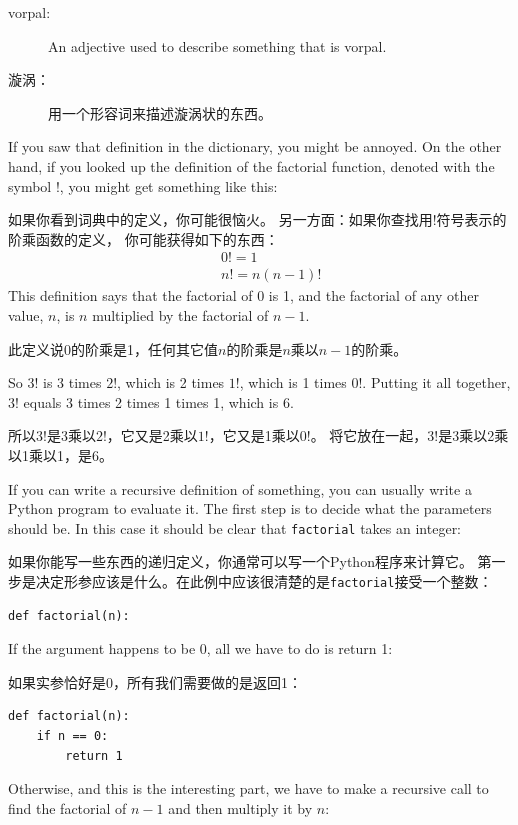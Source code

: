 \documentclass[10pt]{book}
\begin{document}
\begin{CJK}{UTF8}{gbsn}
\begin{description}
\item[vorpal:] An adjective used to describe something that is vorpal.

\item[漩涡：] 用一个形容词来描述漩涡状的东西。

\end{description}

If you saw that definition in the dictionary, you might be annoyed. On
the other hand, if you looked up the definition of the factorial
function, denoted with the symbol $!$, you might get something like
this:

如果你看到词典中的定义，你可能很恼火。
另一方面：如果你查找用$!$符号表示的阶乘函数的定义，
你可能获得如下的东西：
%
\begin{eqnarray*}
&&  0! = 1 \\
&&  n! = n (n-1)!
\end{eqnarray*}
%
This definition says that the factorial of 0 is 1, and the factorial
of any other value, $n$, is $n$ multiplied by the factorial of $n-1$.

此定义说0的阶乘是1，任何其它值$n$的阶乘是$n$乘以$n-1$的阶乘。

So $3!$ is 3 times $2!$, which is 2 times $1!$, which is 1 times
$0!$. Putting it all together, $3!$ equals 3 times 2 times 1 times 1,
which is 6.

所以$3!$是3乘以$2!$，它又是2乘以$1!$，它又是1乘以$0!$。
将它放在一起，$3!$是3乘以2乘以1乘以1，是6。

If you can write a recursive definition of something, you can usually
write a Python program to evaluate it. The first step is to decide
what the parameters should be.  In this case it should be clear
that {\tt factorial} takes an integer:

如果你能写一些东西的递归定义，你通常可以写一个Python程序来计算它。
第一步是决定形参应该是什么。在此例中应该很清楚的是{\tt factorial}接受一个整数：

\begin{verbatim}
def factorial(n):
\end{verbatim}
%
If the argument happens to be 0, all we have to do is return 1:

如果实参恰好是0，所有我们需要做的是返回1：

\begin{verbatim}
def factorial(n):
    if n == 0:
        return 1
\end{verbatim}
%
Otherwise, and this is the interesting part, we have to make a
recursive call to find the factorial of $n-1$ and then multiply it by
$n$:


\end{CJK}
\end{document}
